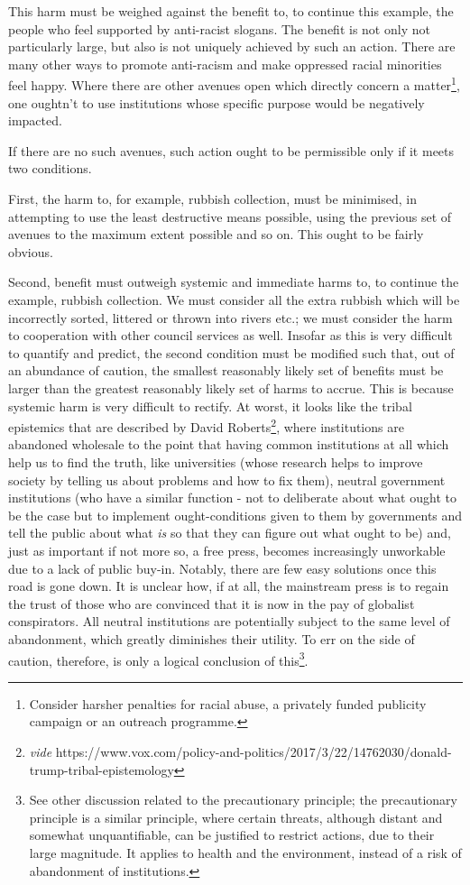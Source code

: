 \documentclass[12pt,a4paper]{report}
\begin{document}
\begin{multicols}{2}
This harm must be weighed against the benefit to, to continue this
example, the people who feel supported by anti-racist slogans. The
benefit is not only not particularly large, but also is not uniquely
achieved by such an action. There are many other ways to promote
anti-racism and make oppressed racial minorities feel happy. Where there
are other avenues open which directly concern a matter\footnote{Consider
	harsher penalties for racial abuse, a privately funded publicity
	campaign or an outreach programme.}, one oughtn't to use institutions
whose specific purpose would be negatively impacted.

If there are no such avenues, such action ought to be permissible only
if it meets two conditions.

First, the harm to, for example, rubbish collection, must be minimised,
in attempting to use the least destructive means possible, using the
previous set of avenues to the maximum extent possible and so on. This
ought to be fairly obvious.

Second, benefit must outweigh systemic and immediate harms to, to
continue the example, rubbish collection. We must consider all the extra
rubbish which will be incorrectly sorted, littered or thrown into rivers
etc.; we must consider the harm to cooperation with other council
services as well. Insofar as this is very difficult to quantify and
predict, the second condition must be modified such that, out of an
abundance of caution, the smallest reasonably likely set of benefits
must be larger than the greatest reasonably likely set of harms to
accrue. This is because systemic harm is very difficult to rectify. At
worst, it looks like the tribal epistemics that are described by David
Roberts\footnote{\textit{vide}
	https://www.vox.com/policy-and-politics/2017/3/22/14762030/donald-trump-tribal-epistemology},
where institutions are abandoned wholesale to the point that having
common institutions at all which help us to find the truth, like
universities (whose research helps to improve society by telling us
about problems and how to fix them), neutral government institutions
(who have a similar function - not to deliberate about what ought to be
the case but to implement ought-conditions given to them by governments
and tell the public about what \textit{is} so that they can figure out
what ought to be) and, just as important if not more so, a free press,
becomes increasingly unworkable due to a lack of public buy-in. Notably,
there are few easy solutions once this road is gone down. It is unclear
how, if at all, the mainstream press is to regain the trust of those who
are convinced that it is now in the pay of globalist conspirators. All
neutral institutions are potentially subject to the same level of
abandonment, which greatly diminishes their utility. To err on the side
of caution, therefore, is only a logical conclusion of this\footnote{See
	other discussion related to the precautionary principle; the
	precautionary principle is a similar principle, where certain threats,
	although distant and somewhat unquantifiable, can be justified to
	restrict actions, due to their large magnitude. It applies to health
	and the environment, instead of a risk of abandonment of institutions.}.


\end{multicols}
\end{document}
